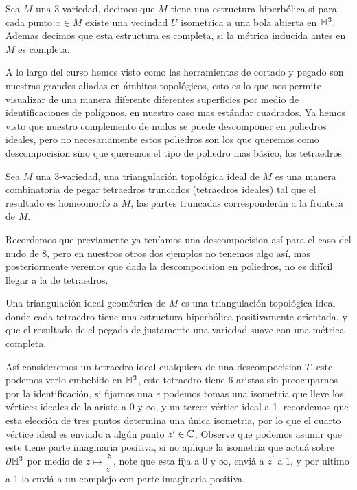 \begin{definition}
   Sea $M$ una 3-variedad, decimos que $M$ tiene una estructura hiperbólica si para cada punto $x\in M$ existe una vecindad $U$ isometrica a una bola abierta en $\mathbb{H}^3$. Ademas decimos que esta estructura es completa, si la métrica inducida antes en $M$ es completa.
\end{definition}

A lo largo del curso hemos visto como las herramientas de cortado y pegado son nuestras grandes aliadas en ámbitos topológicos, esto es lo que nos permite visualizar de una manera diferente diferentes superficies por medio de identificaciones de polígonos, en nuestro caso mas estándar cuadrados. Ya hemos visto que nuestro complemento de nudos se puede descomponer en poliedros ideales, pero no necesariamente estos poliedros son los que queremos como descompocision sino que queremos el tipo de poliedro mas básico, los tetraedros
\begin{definition}
    Sea $M$ una 3-variedad, una triangulación topológica ideal de $M$ es una manera combinatoria de pegar tetraedros truncados (tetraedros ideales) tal que el resultado es homeomorfo a $M$, las partes truncadas corresponderán a la frontera de $M$. 
\end{definition}

Recordemos que previamente ya teníamos una descompocision así para el caso del nudo de 8, pero en nuestros otros dos ejemplos no tenemos algo así, mas posteriormente veremos que dada la descompocision en poliedros, no es difícil llegar a la de tetraedros. 

\begin{definition}
    Una triangulación ideal geométrica de $M$ es una triangulación topológica ideal donde cada tetraedro tiene una estructura hiperbólica positivamente orientada, y que el resultado de el pegado de justamente una variedad suave con una métrica completa.
\end{definition}

Así consideremos un tetraedro ideal cualquiera de una descompocision $T$, este podemos verlo embebido en $\mathbb{H}^3$, este tetraedro tiene 6 aristas sin preocuparnos por la identificación, si fijamos una $e$ podemos tomas una isometria que lleve los vértices ideales de la arista a $0$ y $\infty$, y un tercer vértice ideal a 1, recordemos que esta elección de tres puntos determina una única isometria, por lo que el cuarto vértice ideal es enviado a algún punto $z^\prime\in\mathbb{C}$, Observe que podemos asumir que este tiene parte imaginaria positiva, si no aplique la isometria que actuá sobre $\partial\mathbb{H}^3$ por medio de $z\mapsto \dfrac{z}{z^\prime}$, note que esta fija a $0$ y $\infty$, enviá a $z^\prime$ a $1$, y por ultimo a 1 lo enviá a un complejo con parte imaginaria positiva.

